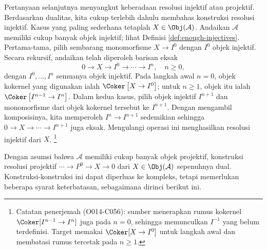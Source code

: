 Pertanyaan selanjutnya menyangkut keberadaan resolusi injektif atau projektif. Berdasarkan dualitas, kita cukup terlebih dahulu membahas konstruksi resolusi injektif. Kasus yang paling sederhana tetaplah $X \in \Obj(\mathcal{A})$. Andaikan $\mathcal{A}$ memiliki cukup banyak objek injektif; lihat Definisi \ref{def:enough-injectives}. Pertama-tama, pilih sembarang monomorfisme $X \to I^0$ dengan $I^0$ objek injektif. Secara rekursif, andaikan telah diperoleh barisan eksak
\[ 0 \to X \to I^0 \to \cdots \to I^n, \quad n \geq 0, \]
dengan $I^0, \ldots, I^n$ semuanya objek injektif. Pada langkah awal $n=0$, objek kokernel yang digunakan ialah $\Coker\left[ X \to I^0\right]$; untuk $n \geq 1$, objek itu ialah $\Coker\left[ I^{n-1} \to I^n\right]$. Dalam kedua kasus, pilih objek injektif $I^{n+1}$ dan monomorfisme dari objek kokernel tersebut ke $I^{n+1}$. Dengan mengambil komposisinya, kita memperoleh $I^n \to I^{n+1}$ sedemikian sehingga $0 \to X \to \cdots \to I^{n+1}$ juga eksak. Mengulangi operasi ini menghasilkan resolusi injektif dari $X$.
\footnote{Catatan penerjemah (O014-C056): sumber menerapkan rumus kokernel
$\Coker[I^{n-1}\to I^n]$ juga pada $n=0$, sehingga memunculkan $I^{-1}$
yang belum terdefinisi. Target memakai $\Coker[X\to I^0]$ untuk langkah awal
dan membatasi rumus tercetak pada $n\geq 1$.}

Dengan asumsi bahwa $\mathcal{A}$ memiliki cukup banyak objek projektif, konstruksi resolusi projektif $\cdots \to P^0 \to X \to 0$ dari $X \in \Obj(\mathcal{A})$ sepenuhnya dual. Konstruksi-konstruksi ini dapat diperluas ke kompleks, tetapi memerlukan beberapa syarat keterbatasan, sebagaimana dirinci berikut ini.

